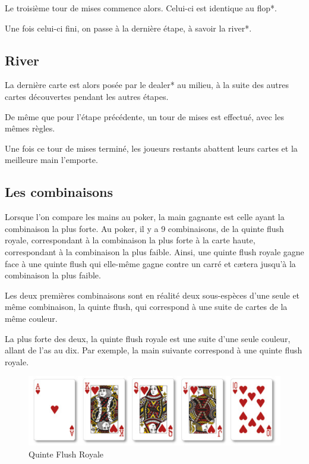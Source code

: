 \documentclass{report}
\begin{document}
Le troisième tour de mises commence alors. Celui-ci est identique au flop*.\par

Une fois celui-ci fini, on passe à la dernière étape, à savoir la river*.\par
\subsection{River}
\hspace{0.5cm}La dernière carte est alors posée par le dealer* au milieu, à la suite des autres cartes découvertes pendant les autres étapes. \par
De même que pour l'étape précédente, un tour de mises est effectué, avec les mêmes règles.\par
Une fois ce tour de mises terminé, les joueurs restants abattent leurs cartes et la meilleure main l'emporte.\par

\subsection{Les combinaisons}
\hspace{0.5cm}Lorsque l'on compare les mains au poker, la main gagnante est celle ayant la combinaison la plus forte. Au poker, il y a 9 combinaisons, de la quinte flush royale, correspondant à la combinaison la plus forte à la carte haute, correspondant à la combinaison la plus faible. Ainsi, une quinte flush royale gagne face à une quinte flush qui elle-même gagne contre un carré et cætera jusqu'à la combinaison la plus faible. \par

Les deux premières combinaisons sont en réalité deux sous-espèces d'une seule et même combinaison, la quinte flush, qui correspond à une suite de cartes de la même couleur.\par

La plus forte des deux, la quinte flush royale est une suite d'une seule couleur, allant de l'as au dix. Par exemple, la main suivante correspond à une quinte flush royale. \par

		\begin{figure}[h]
			\begin{center}
				\includegraphics[scale=0.3]{./imagesRapport/quinteFlushRoyale.jpg}
			\end{center}
			\caption[Quinte Flush Royale]{Quinte Flush Royale}
		\end{figure}
		\medskip
\end{document}
